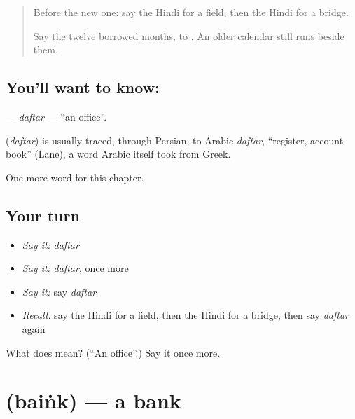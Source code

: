 \label{lesson:HI-C153-daftar}



\begin{quote}
Before the new one: say the Hindi for a field, then the Hindi for a bridge.

Say the twelve borrowed months, \textbf{} to \textbf{}. An older calendar still runs beside them.
\end{quote}

\subsection*{You'll want to know: }
\textbf{} — \emph{daftar} — \textquotedblleft{}an office\textquotedblright{}.

\begin{cousinweb}
\textbf{} (\emph{daftar}) is usually traced, through Persian, to Arabic \emph{daftar}, \textquotedblleft{}register, account book\textquotedblright{} (Lane), a word Arabic itself took from Greek.
\end{cousinweb}

\begin{grammarlens}[title={What you've built}]
One more word for this chapter.
\end{grammarlens}

\subsection*{Your turn}
\begin{itemize}
\raggedright
  \item \emph{Say it:} \emph{daftar}
  \item \emph{Say it:} \emph{daftar}, once more
  \item \emph{Say it:} say \emph{daftar}
  \item \emph{Recall:} say the Hindi for a field, then the Hindi for a bridge, then say \emph{daftar} again
\end{itemize}

\begin{tcolorbox}[breakable,colback=teal!4,colframe=teal!35!black,title={Before you move on}]
What does  mean? (\textquotedblleft{}An office\textquotedblright{}.) Say it once more.
\end{tcolorbox}
\section[\texorpdfstring{\hi{बैंक} (baiṅk)}{बैंक (baiṅk)}]{ (baiṅk) — a bank}


